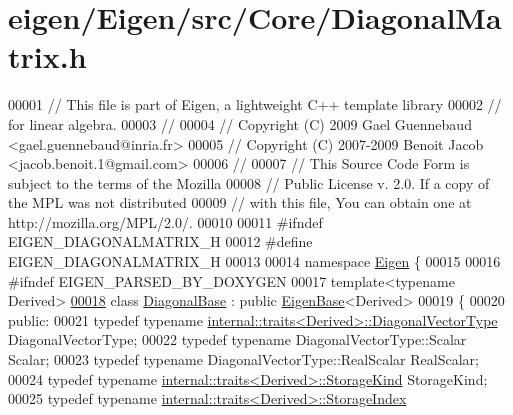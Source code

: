 \hypertarget{eigen_2_eigen_2src_2_core_2_diagonal_matrix_8h_source}{}\section{eigen/\+Eigen/src/\+Core/\+Diagonal\+Matrix.h}
\label{eigen_2_eigen_2src_2_core_2_diagonal_matrix_8h_source}

\begin{DoxyCode}
00001 \textcolor{comment}{// This file is part of Eigen, a lightweight C++ template library}
00002 \textcolor{comment}{// for linear algebra.}
00003 \textcolor{comment}{//}
00004 \textcolor{comment}{// Copyright (C) 2009 Gael Guennebaud <gael.guennebaud@inria.fr>}
00005 \textcolor{comment}{// Copyright (C) 2007-2009 Benoit Jacob <jacob.benoit.1@gmail.com>}
00006 \textcolor{comment}{//}
00007 \textcolor{comment}{// This Source Code Form is subject to the terms of the Mozilla}
00008 \textcolor{comment}{// Public License v. 2.0. If a copy of the MPL was not distributed}
00009 \textcolor{comment}{// with this file, You can obtain one at http://mozilla.org/MPL/2.0/.}
00010 
00011 \textcolor{preprocessor}{#ifndef EIGEN\_DIAGONALMATRIX\_H}
00012 \textcolor{preprocessor}{#define EIGEN\_DIAGONALMATRIX\_H}
00013 
00014 \textcolor{keyword}{namespace }\hyperlink{namespace_eigen}{Eigen} \{ 
00015 
00016 \textcolor{preprocessor}{#ifndef EIGEN\_PARSED\_BY\_DOXYGEN}
00017 \textcolor{keyword}{template}<\textcolor{keyword}{typename} Derived>
\hyperlink{class_eigen_1_1_diagonal_base}{00018} \textcolor{keyword}{class }\hyperlink{class_eigen_1_1_diagonal_base}{DiagonalBase} : \textcolor{keyword}{public} \hyperlink{group___core___module_struct_eigen_1_1_eigen_base}{EigenBase}<Derived>
00019 \{
00020   \textcolor{keyword}{public}:
00021     \textcolor{keyword}{typedef} \textcolor{keyword}{typename} \hyperlink{struct_eigen_1_1internal_1_1traits}{internal::traits<Derived>::DiagonalVectorType}
       DiagonalVectorType;
00022     \textcolor{keyword}{typedef} \textcolor{keyword}{typename} DiagonalVectorType::Scalar Scalar;
00023     \textcolor{keyword}{typedef} \textcolor{keyword}{typename} DiagonalVectorType::RealScalar RealScalar;
00024     \textcolor{keyword}{typedef} \textcolor{keyword}{typename} \hyperlink{struct_eigen_1_1internal_1_1traits}{internal::traits<Derived>::StorageKind} 
      StorageKind;
00025     \textcolor{keyword}{typedef} \textcolor{keyword}{typename} \hyperlink{struct_eigen_1_1internal_1_1traits}{internal::traits<Derived>::StorageIndex} 

\end{DoxyCode}
